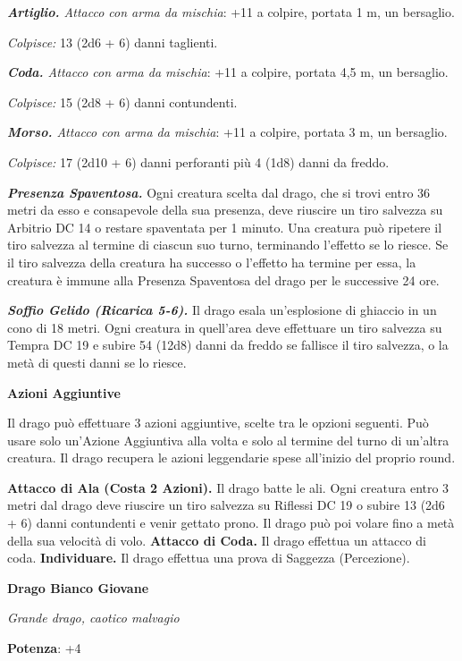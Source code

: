 \begin{multicols}{2}
\emph{\textbf{Artiglio.} Attacco con arma da mischia}: +11 a colpire,
portata 1 m, un bersaglio.

\emph{Colpisce:} 13 (2d6 + 6) danni taglienti.

\emph{\textbf{Coda.} Attacco con arma da mischia}: +11 a colpire,
portata 4,5 m, un bersaglio.

\emph{Colpisce:} 15 (2d8 + 6) danni contundenti.

\emph{\textbf{Morso.} Attacco con arma da mischia}: +11 a colpire,
portata 3 m, un bersaglio.

\emph{Colpisce:} 17 (2d10 + 6) danni perforanti più 4 (1d8) danni da
freddo.

\emph{\textbf{Presenza Spaventosa.}} Ogni creatura scelta dal drago, che
si trovi entro 36 metri da esso e consapevole della sua presenza, deve
riuscire un tiro salvezza su Arbitrio DC 14 o restare spaventata per 1
minuto. Una creatura può ripetere il tiro salvezza al termine di ciascun
suo turno, terminando l'effetto se lo riesce. Se il tiro salvezza della
creatura ha successo o l'effetto ha termine per essa, la creatura è
immune alla Presenza Spaventosa del drago per le successive 24 ore.

\emph{\textbf{Soffio Gelido (Ricarica 5-6).}} Il drago esala
un'esplosione di ghiaccio in un cono di 18 metri. Ogni creatura in
quell'area deve effettuare un tiro salvezza su Tempra DC 19 e
subire 54 (12d8) danni da freddo se fallisce il tiro salvezza, o la metà
di questi danni se lo riesce.

\textbf{Azioni Aggiuntive}

Il drago può effettuare 3 azioni aggiuntive, scelte tra le opzioni
seguenti. Può usare solo un'Azione Aggiuntiva alla volta e solo al
termine del turno di un'altra creatura. Il drago recupera le azioni
leggendarie spese all'inizio del proprio round.

\textbf{Attacco di Ala (Costa 2 Azioni).} Il drago batte le ali. Ogni
creatura entro 3 metri dal drago deve riuscire un tiro salvezza su Riflessi DC 19 o subire 13 (2d6 + 6) danni contundenti e venir gettato
prono. Il drago può poi volare fino a metà della sua velocità di volo.
\textbf{Attacco di Coda.} Il drago effettua un attacco di coda.
\textbf{Individuare.} Il drago effettua una prova di Saggezza
(Percezione).

\textbf{Drago Bianco Giovane}

\emph{Grande drago, caotico malvagio}

\textbf{Potenza}: +4


\end{multicols}
